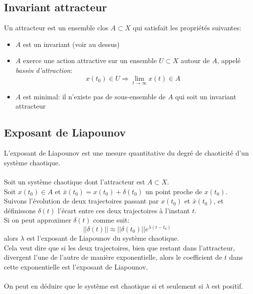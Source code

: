 \documentclass[a4paper]{article}
\begin{document}
\subsection{Invariant attracteur}
Un attracteur est un ensemble clos \(A \subset X\) qui satisfait les propriétés
suivantes:
\begin{itemize}
	\item \(A\) est un invariant (voir au dessus)
	\item \(A\) exerce une action attractive sur un ensemble \(U \subset X\)
		autour de \(A\), appelé \emph{bassin d'attraction}:
		\[x(t_0)\in U\Rightarrow \lim_{t\to\infty}x(t)\in A\]
	\item \(A\) est minimal: il n'existe pas de sous-ensemble de \(A\) qui soit
		un invariant attracteur
\end{itemize}

\subsection{Exposant de Liapounov}
L'exposant de Liapounov est une mesure quantitative du degré de chaoticité d'un
système chaotique.
\paragraph{}
Soit un système chaotique dont l'attracteur est \(A\subset X\).\\
Soit \(x(t_0)\in A\) et \(\bar x(t_0)=x(t_0)+\delta(t_0)\) un point proche de
\(x(t_0)\).\\
Suivons l'évolution de deux trajectoires passant par \(x(t_0)\) et
\(\bar x(t_0)\), et définissons \(\delta(t)\) l'écart entre ces deux trajectoires
à l'instant \(t\).\\
Si on peut approximer \(\delta(t)\) comme suit:
\[||\delta(t)||\approx||\delta(t_0)||e^{\lambda(t-t_0)}\]
alors \(\lambda\) est l'exposant de Liapounov du système chaotique.\\
Cela veut dire que si les deux trajectoires, bien que restant dans l'attracteur,
divergent l'une de l'autre de manière exponentielle, alors le coefficient
de \(t\) dans cette exponentielle est l'exposant de Liapounov.
\paragraph{}
On peut en déduire que le système est chaotique si et seulement si \(\lambda\)
est positif.
\end{document}
